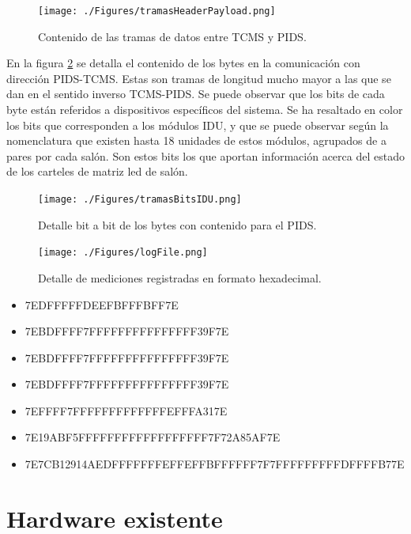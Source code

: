 \begin{figure}[H]
	\centering
	\texttt{[image: ./Figures/tramasHeaderPayload.png]}
	\caption{Contenido de las tramas de datos entre TCMS y PIDS.}
	\label{fig:tramasHeaderPayload}
\end{figure}

En la figura \ref{fig:tramasBitsIDU} se detalla el contenido de los bytes en la comunicación con dirección PIDS-TCMS. Estas son tramas de longitud mucho mayor a las que se dan en el sentido inverso TCMS-PIDS. Se puede observar que los bits de cada byte están referidos a dispositivos específicos del sistema. Se ha resaltado en color los bits que corresponden a los módulos IDU, y que se puede observar según la nomenclatura que existen hasta 18 unidades de estos módulos, agrupados de a pares por cada salón. Son estos bits los que aportan información acerca del estado de los carteles de matriz led de salón.\\


\begin{figure}[H]
	\centering
	\texttt{[image: ./Figures/tramasBitsIDU.png]}
	\caption{Detalle bit a bit de los bytes con contenido para el PIDS.}
	\label{fig:tramasBitsIDU}
\end{figure}



\begin{figure}[H]
	\centering
	\texttt{[image: ./Figures/logFile.png]}
	\caption{Detalle de mediciones registradas en formato hexadecimal.}
	\label{fig:logFile}
\end{figure}


\begin{itemize}
\item 7EDFFFFFDEEFBFFFBFF7E
\item 7EBDFFFF7FFFFFFFFFFFFFFF39F7E
\item 7EBDFFFF7FFFFFFFFFFFFFFF39F7E
\item 7EBDFFFF7FFFFFFFFFFFFFFF39F7E
\item 7EFFFF7FFFFFFFFFFFFFEFFFA317E
\item 7E19ABF5FFFFFFFFFFFFFFFFFF7F72A85AF7E
\item 7E7CB12914AEDFFFFFFFEFFEFFBFFFFFF7F7FFFFFFFFFDFFFFB77E
\end{itemize}



\section{Hardware existente}

